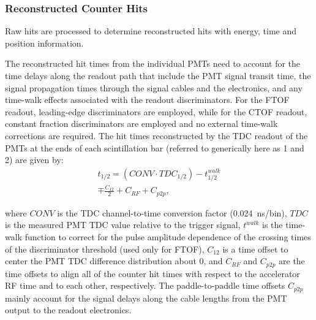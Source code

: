 
\subsubsection{Reconstructed Counter Hits}
\label{rec:hits}

Raw hits are processed to determine reconstructed hits with energy, time and position information. 

The reconstructed hit times from the individual PMTs need to account for the time delays along the readout
path that include the PMT signal transit time, the signal propagation times through the signal cables and the
electronics, and any time-walk effects associated with the readout discriminators. For the FTOF readout,
leading-edge discriminators are employed, while for the CTOF readout, constant fraction discriminators are
employed and no external time-walk corrections are required. The hit times reconstructed by the TDC readout
of the PMTs at the ends of each scintillation bar (referred to generically here as 1 and 2) are given by:
\begin{multline}
t_{1/2} = (CONV \cdot TDC_{1/2}) - t_{1/2}^{walk} \\ \mp \frac{C_{12}}{2} + C_{RF} + C_{p2p},
\end{multline}

\noindent
where $CONV$ is the TDC channel-to-time conversion factor (0.024~ns/bin), $TDC$ is the measured PMT TDC
value relative to the trigger signal, $t^{walk}$ is the time-walk function to correct for the pulse amplitude
dependence of the crossing times of the discriminator threshold (used only for FTOF), $C_{12}$ is a time offset
to center the PMT TDC difference distribution about 0, and $C_{RF}$ and $C_{p2p}$ are the time offsets to
align all of the counter hit times with respect to the accelerator RF time and to each other, respectively. The paddle-to-paddle
time offsets $C_{p2p}$ mainly account for the signal delays along the cable lengths from the PMT output to the
readout electronics.

